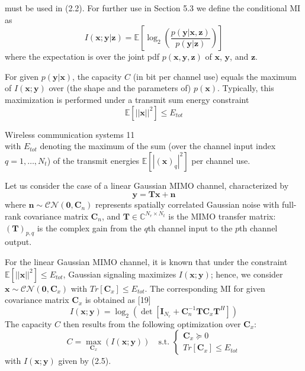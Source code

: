 \documentclass[11pt,a4paper]{report}
\begin{document}
must be used in (2.2). For further use in Section 5.3 we define the conditional MI as
\begin{equation*}
    I(\mathbf{x};\mathbf{y}|\mathbf{z}) = \mathbb{E} \left[ \log_2 \left( \frac{p(\mathbf{y}|\mathbf{x},\mathbf{z})}{p(\mathbf{y}|\mathbf{z})} \right) \right]
\end{equation*}
where the expectation is over the joint pdf $p(\mathbf{x}, \mathbf{y}, \mathbf{z})$ of $\mathbf{x}$, $\mathbf{y}$, and $\mathbf{z}$.

For given $p(\mathbf{y}|\mathbf{x})$, the capacity $C$ (in bit per channel use) equals the maximum of $I(\mathbf{x};\mathbf{y})$ over (the shape and the parameters of) $p(\mathbf{x})$. Typically, this maximization is performed under a transmit sum energy constraint
\begin{equation}
    \mathbb{E}[||\mathbf{x}||^2] \leq E_{tot}
\end{equation}

\newpage
 Wireless communication systems \hfill 11 \\

\noindent with $E_{tot}$ denoting the maximum of the sum (over the channel input index $q = 1, \dots, N_t$) of the transmit energies $\mathbb{E}[|(\mathbf{x})_q|^2]$ per channel use.

Let us consider the case of a linear Gaussian MIMO channel, characterized by
\begin{equation}
    \mathbf{y} = \mathbf{T}\mathbf{x} + \mathbf{n}
\end{equation}
where $\mathbf{n} \sim \mathcal{CN}(\mathbf{0}, \mathbf{C}_n)$ represents spatially correlated Gaussian noise with full-rank covariance matrix $\mathbf{C}_n$, and $\mathbf{T} \in \mathbb{C}^{N_r \times N_t}$ is the MIMO transfer matrix: $(\mathbf{T})_{p,q}$ is the complex gain from the $q$th channel input to the $p$th channel output.

For the linear Gaussian MIMO channel, it is known that under the constraint $\mathbb{E}[||\mathbf{x}||^2] \leq E_{tot}$, Gaussian signaling maximizes $I(\mathbf{x};\mathbf{y})$; hence, we consider $\mathbf{x} \sim \mathcal{CN}(\mathbf{0}, \mathbf{C}_x)$ with $Tr[\mathbf{C}_x] \leq E_{tot}$. The corresponding MI for given covariance matrix $\mathbf{C}_x$ is obtained as [19]
\begin{equation}
    I(\mathbf{x};\mathbf{y}) = \log_2(\det[\mathbf{I}_{N_r} + \mathbf{C}_n^{-1} \mathbf{T} \mathbf{C}_x \mathbf{T}^H])
\end{equation}
The capacity $C$ then results from the following optimization over $\mathbf{C}_x$:
\begin{equation}
    C = \max_{\mathbf{C}_x} (I(\mathbf{x};\mathbf{y})) \quad \text{s.t. } \begin{cases} \mathbf{C}_x \succeq 0 \\ Tr[\mathbf{C}_x] \leq E_{tot} \end{cases}
\end{equation}
with $I(\mathbf{x};\mathbf{y})$ given by (2.5).
\end{document}
